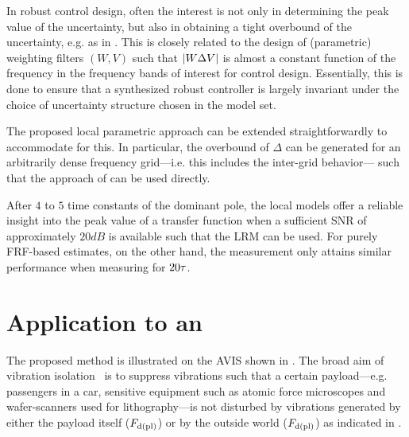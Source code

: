 \begin{remark} \label{rem:lrmhinf:constructWeights}
In robust control design, often the interest is not only in determining the peak value of the uncertainty, but also in obtaining a tight overbound of the uncertainty, e.g. as in \citet{Scheid1995}.
This is closely related to the design of (parametric) weighting filters $(W,V)$ such that $\left| W \Delta V \right|$ is almost a constant function of the frequency in the frequency bands of interest for control design.
Essentially, this is done to ensure that a synthesized robust controller is largely invariant under the choice of uncertainty structure chosen in the model set.

The proposed local parametric approach can be extended straightforwardly to accommodate for this.
In particular, the overbound of $\Delta$ can be generated for an arbitrarily dense frequency grid---i.e. this includes the inter-grid behavior--- such that the approach of \citet{Scheid1995} can be used directly.
\end{remark}

\begin{guideline}
\begin{minipage}{0.725\textwidth}
After $4$ to $5$ time constants of the dominant pole, the local models offer a reliable insight into the peak value of a transfer function when a sufficient \gls{SNR} of approximately $20\unit{dB}$ is available such that the \gls{LRM} can be used.
For purely \gls{FRF}-based estimates, on the other hand, the measurement only attains similar performance when measuring for $20\tau_{}$.
\end{minipage}
\hfill
\begin{minipage}{0.25\textwidth}
\setlength\figurewidth{\columnwidth}
\setlength\figureheight{0.618\figurewidth}

\end{minipage}
\end{guideline}

\section{Application to an }
\label{sec:lrmhinf:measurement}
The proposed method is illustrated on the \gls{AVIS} shown in .
The broad aim of vibration isolation~\citep{Karnopp1995,Collette2011} is to suppress vibrations such that a certain payload---e.g. passengers in a car, sensitive equipment such as atomic force microscopes and wafer-scanners used for lithography---is not disturbed by vibrations generated by either the payload itself ($F_{\mathrm{d(pl)}}$) or by the outside world ($F_{\mathrm{d(pl)}}$) as indicated in .

